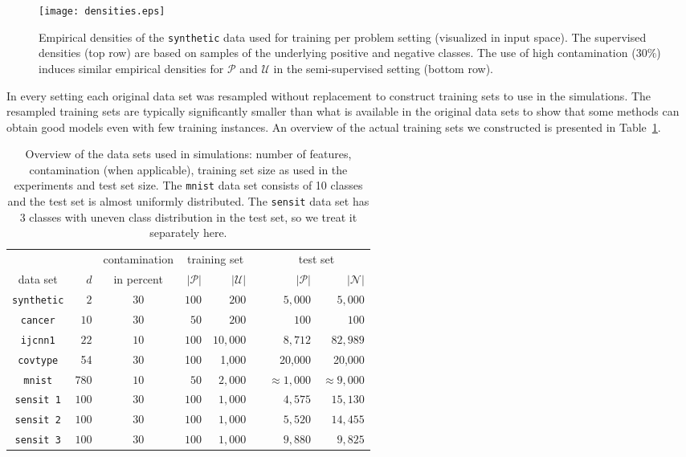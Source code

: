 \documentclass[preprint,elsarticle-num,12pt]{elsarticle}
\begin{document}
\begin{figure}[!h]
  \centering
  \texttt{[image: densities.eps]}
  \caption{Empirical densities of the \texttt{synthetic} data used for training per problem setting (visualized in input space). The supervised densities (top row) are based on samples of the underlying positive and negative classes. The use of high contamination ($30\%$) induces similar empirical densities for $\mathcal{P}$ and $\mathcal{U}$ in the semi-supervised setting (bottom row).} %
  \label{fig:densities}
\end{figure}


In every setting each original data set was resampled without replacement to construct training sets to use in the simulations. The resampled training sets are typically significantly smaller than what is available in the original data sets to show that some methods can obtain good models even with few training instances. An overview of the actual training sets we constructed is presented in Table~\ref{table:datasets}. 


\begin{table}[!ht]
\centering
\begin{tabular}{crcrrcrr}
\toprule
 & & contamination & \multicolumn{2}{c}{training set} & & \multicolumn{2}{c}{test set} \\ \cline{4-5} \cline{7-8}
data set & $d$ & in percent & $|\mathcal{P}|$ & $|\mathcal{U}|$ & & $|\mathcal{P}|$ & $|\mathcal{N}|$ \\
\midrule
\texttt{synthetic} & $2$ & $30$ & $100$ & $200$ & & $5,000$ & $5,000$ \\
\texttt{cancer} & $10$ & $30$   & $50$ & $200$ & & $100$ & $100$ \\
\texttt{ijcnn1} & $22$ & $10$   & $100$ & $10,000$ & & $8,712$ & $82,989$ \\
\texttt{covtype} & 54 & 30 & 100 & 1,000 & & 20,000 & 20,000 \\
\texttt{mnist} & $780$ & $10$   & $50$ & $2,000$ & & $\approx1,000$ & $\approx9,000$ \\
\texttt{sensit 1} & $100$ & $30$  & $100$ & $1,000$ & & $4,575$ & $15,130$ \\
\texttt{sensit 2} & $100$ & $30$  & $100$ & $1,000$ & & $5,520$ & $14,455$ \\
\texttt{sensit 3} & $100$ & $30$  & $100$ & $1,000$ & & $9,880$ & $9,825$ \\
\bottomrule
\end{tabular}
\caption{Overview of the data sets used in simulations: number of features, contamination (when applicable), training set size as used in the experiments and test set size. The \texttt{mnist} data set consists of 10 classes and the test set is almost uniformly distributed. The \texttt{sensit} data set has 3 classes with uneven class distribution in the test set, so we treat it separately here.}

\label{table:datasets}
\end{table}
\end{document}

